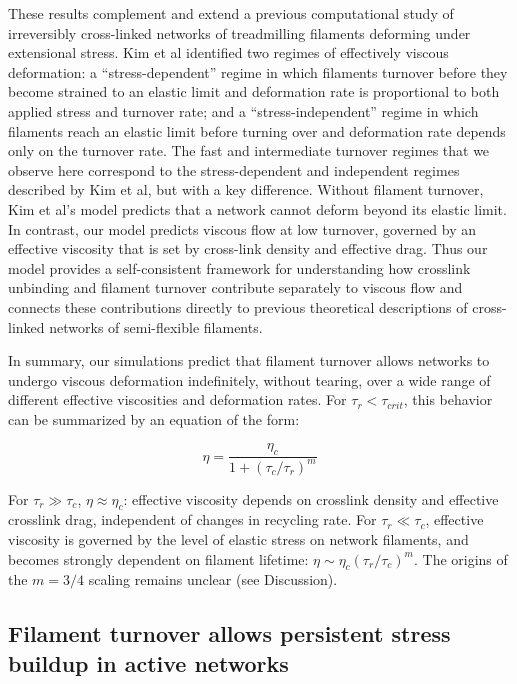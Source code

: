 These results complement and extend a previous computational study of irreversibly cross-linked networks of treadmilling filaments deforming under extensional stress\cite{Kim2014526}. Kim et al identified two regimes of effectively viscous deformation: a ``stress-dependent'' regime in which filaments turnover before they become strained to an elastic limit and deformation rate is proportional to both applied stress and turnover rate; and a ``stress-independent'' regime in which filaments reach an elastic limit before turning over and deformation rate depends only on the turnover rate. The fast and intermediate turnover regimes that we observe here correspond to the stress-dependent and independent regimes described by Kim et al, but with a key difference. Without filament turnover, Kim et al's model predicts that a network cannot deform beyond its elastic limit.  In contrast, our model predicts viscous flow at low turnover, governed by an effective viscosity that is set by cross-link density and effective drag. Thus our model provides a self-consistent framework for understanding how crosslink unbinding and filament turnover contribute separately to viscous flow and connects these contributions directly to previous theoretical descriptions of cross-linked networks of semi-flexible filaments. 

In summary, our simulations predict that filament turnover allows networks to undergo viscous deformation indefinitely, without tearing, over a wide range of different effective viscosities and deformation rates. For $\tau_r < \tau_{crit}$, this behavior can be summarized by an equation of the form:

\begin{equation}
	\label{eqn:simple_eta}
	\eta = \frac{\eta_c}{1+(\tau_c/\tau_r)^m}  
\end{equation}

For $\tau_r \gg \tau_c$, $\eta\approx\eta_c$: effective viscosity depends on crosslink density and effective crosslink drag, independent of changes in recycling rate. For $\tau_r\ll\tau_c$,  effective viscosity is governed by the level of elastic stress on network filaments, and becomes strongly dependent on filament lifetime: $\eta\sim\eta_c(\tau_r/\tau_c)^m$. The origins of the $m = 3/4$ scaling remains unclear (see Discussion).




\subsection{Filament turnover allows persistent stress buildup in active networks}

